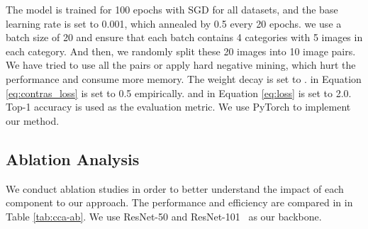 \documentclass[letterpaper]{article} \usepackage{aaai20}  \usepackage{times}  \usepackage{helvet} \usepackage{courier}  \usepackage[hyphens]{url}  \usepackage{graphicx} \urlstyle{rm} \def\UrlFont{\rm}  \usepackage{graphicx}  \frenchspacing  \setlength{\pdfpagewidth}{8.5in}  \setlength{\pdfpageheight}{11in}  \usepackage{amsmath,amssymb}
\begin{document}
The model is trained for 100 epochs with SGD for all datasets, and the base learning rate is set to 0.001, which annealed by 0.5 every 20 epochs.
we use a batch size of 20 and ensure that each batch contains 4 categories with 5 images in each category. And then, we randomly split
these 20 images into 10 image pairs. We have tried to use
all the  pairs or apply hard negative mining, which
hurt the performance and consume more memory.
The weight decay is set to .  in Equation \ref{eq:contras_loss} is set to 0.5 empirically. and  in Equation \ref{eq:loss} is set to 2.0. Top-1 accuracy is used as the evaluation metric. We use PyTorch to implement our method.

\subsection{Ablation Analysis}
\label{sec:ablation}

We conduct ablation studies in order to better understand the impact of each component to our approach.
The performance and efficiency are compared in in Table \ref{tab:cca-ab}.
We use ResNet-50 and ResNet-101~\cite{DBLP:conf/cvpr/HeZRS16} as our backbone.


\begin{table}
\small
\begin{center}
\end{center}
\caption{Ablation studies of our network on CUB-200-2011. CIN consists of SCI and CCI. Time unit is ms.}
\label{tab:cca-ab}
\end{table}
\end{document}
